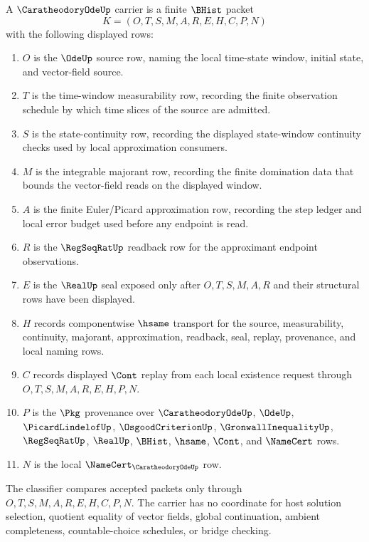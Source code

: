 \begin{definition}
\label{def:caratheodory-ode-carrier}
A $\CaratheodoryOdeUp$ carrier is a finite $\BHist$ packet
$$
K=(O,T,S,M,A,R,E,H,C,P,N)
$$
with the following displayed rows:
\begin{enumerate}
\item $O$ is the $\OdeUp$ source row, naming the local time-state window, initial state, and vector-field source.
\item $T$ is the time-window measurability row, recording the finite observation schedule by which time slices of the source are admitted.
\item $S$ is the state-continuity row, recording the displayed state-window continuity checks used by local approximation consumers.
\item $M$ is the integrable majorant row, recording the finite domination data that bounds the vector-field reads on the displayed window.
\item $A$ is the finite Euler/Picard approximation row, recording the step ledger and local error budget used before any endpoint is read.
\item $R$ is the $\RegSeqRatUp$ readback row for the approximant endpoint observations.
\item $E$ is the $\RealUp$ seal exposed only after $O,T,S,M,A,R$ and their structural rows have been displayed.
\item $H$ records componentwise $\hsame$ transport for the source, measurability, continuity, majorant, approximation, readback, seal, replay, provenance, and local naming rows.
\item $C$ records displayed $\Cont$ replay from each local existence request through $O,T,S,M,A,R,E,H,P,N$.
\item $P$ is the $\Pkg$ provenance over $\CaratheodoryOdeUp$, $\OdeUp$, $\PicardLindelofUp$, $\OsgoodCriterionUp$, $\GronwallInequalityUp$, $\RegSeqRatUp$, $\RealUp$, $\BHist$, $\hsame$, $\Cont$, and $\NameCert$ rows.
\item $N$ is the local $\NameCert_{\CaratheodoryOdeUp}$ row.
\end{enumerate}
The classifier compares accepted packets only through $O,T,S,M,A,R,E,H,C,P,N$. The carrier has no coordinate for host solution selection, quotient equality of vector fields, global continuation, ambient completeness, countable-choice schedules, or bridge checking.
\end{definition}

